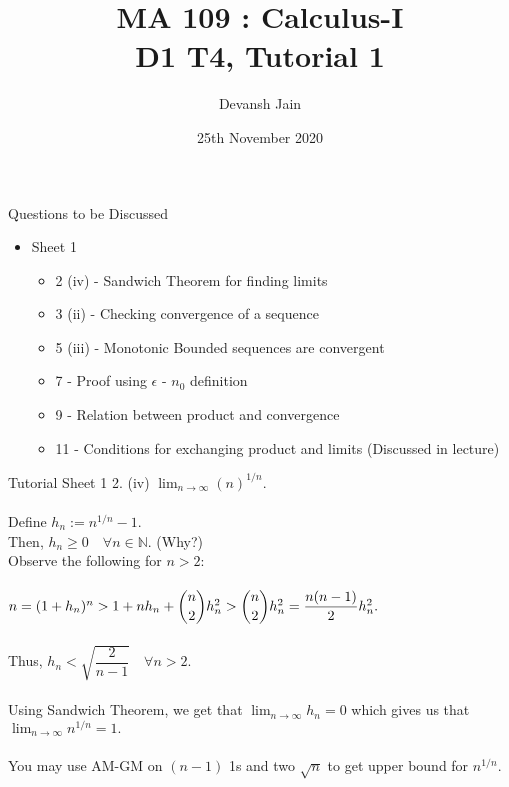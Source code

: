 \documentclass[aspectratio=169]{beamer}
\title{MA 109 : Calculus-I\\ D1 T4, Tutorial 1}
\author{Devansh Jain}
\date[25-11-2020]{25th November 2020}
\institute[IITB]{IIT Bombay}
\begin{document}
\begin{frame}
    \titlepage
\end{frame}

\begin{frame}{Questions to be Discussed}
    \begin{itemize}
        \item Sheet 1
            \begin{itemize}
                \item 2 (iv) - Sandwich Theorem for finding limits
                \item 3 (ii) - Checking convergence of a sequence
                \item 5 (iii) - Monotonic Bounded sequences are convergent
                \item 7 - Proof using $\epsilon$ - $n_0$ definition
                \item 9 - Relation between product and convergence
                \item 11 - Conditions for exchanging product and limits (Discussed in lecture)
            \end{itemize}
    \end{itemize}
\end{frame}

\begin{frame}{Tutorial Sheet 1}
	2. (iv) $\displaystyle\lim_{n\to \infty}(n)^{1/n}.$ \\~\\
	Define $h_n := n^{1/n} - 1.$ \\
	Then, $h_n \ge 0 \quad \forall n \in \mathbb{N}.$ (Why?) \\
	Observe the following for $n > 2:$ \\~\\
	$n = (1 + h_n)^n > 1 + nh_n + \dbinom{n}{2}h_n^2 > \dbinom{n}{2}h_n^2 = \dfrac{n(n-1)}{2}h_n^2.$ \\~\\
	Thus, $h_n < \sqrt{\dfrac{2}{n-1}} \quad \forall n > 2.$ \\~\\
	Using Sandwich Theorem, we get that $\displaystyle\lim_{n\to \infty}h_n = 0$ which gives us that $\displaystyle\lim_{n\to \infty}n^{1/n} = 1.$ \\~\\
	You may use AM-GM on $(n-1)$ 1s and two $\sqrt{n}$ to get upper bound for $n^{1/n}$.
\end{frame}
\end{document}
